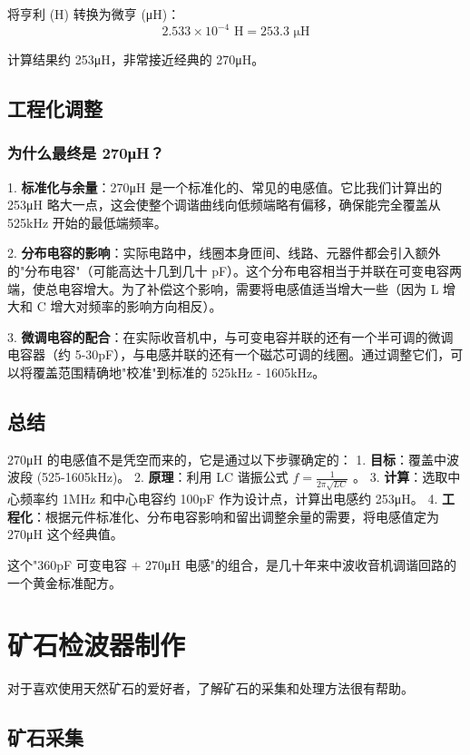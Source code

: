 \documentclass[12pt,UTF8]{ctexbook}
\begin{document}
将亨利 (H) 转换为微亨 (μH)：
\[ 2.533\times10^{−4} \text{ H} = 253.3 \text{ μH} \]

计算结果约 253μH，非常接近经典的 270μH。

\section{工程化调整}

\subsection{为什么最终是 270μH？}

1. \textbf{标准化与余量}：270μH 是一个标准化的、常见的电感值。它比我们计算出的 253μH 略大一点，这会使整个调谐曲线向低频端略有偏移，确保能完全覆盖从 525kHz 开始的最低端频率。

2. \textbf{分布电容的影响}：实际电路中，线圈本身匝间、线路、元器件都会引入额外的"分布电容"（可能高达十几到几十 pF）。这个分布电容相当于并联在可变电容两端，使总电容增大。为了补偿这个影响，需要将电感值适当增大一些（因为 L 增大和 C 增大对频率的影响方向相反）。

3. \textbf{微调电容的配合}：在实际收音机中，与可变电容并联的还有一个半可调的微调电容器（约 5-30pF），与电感并联的还有一个磁芯可调的线圈。通过调整它们，可以将覆盖范围精确地"校准"到标准的 525kHz - 1605kHz。

\section{总结}

270μH 的电感值不是凭空而来的，它是通过以下步骤确定的：
1. \textbf{目标}：覆盖中波波段 (525-1605kHz)。
2. \textbf{原理}：利用 LC 谐振公式  $f=\frac{1}{2\pi\sqrt{LC}}$ 。
3. \textbf{计算}：选取中心频率约 1MHz 和中心电容约 100pF 作为设计点，计算出电感约 253μH。
4. \textbf{工程化}：根据元件标准化、分布电容影响和留出调整余量的需要，将电感值定为 270μH 这个经典值。

这个"360pF 可变电容 + 270μH 电感"的组合，是几十年来中波收音机调谐回路的一个黄金标准配方。

\chapter{矿石检波器制作}

对于喜欢使用天然矿石的爱好者，了解矿石的采集和处理方法很有帮助。

\section{矿石采集}
\end{document}

